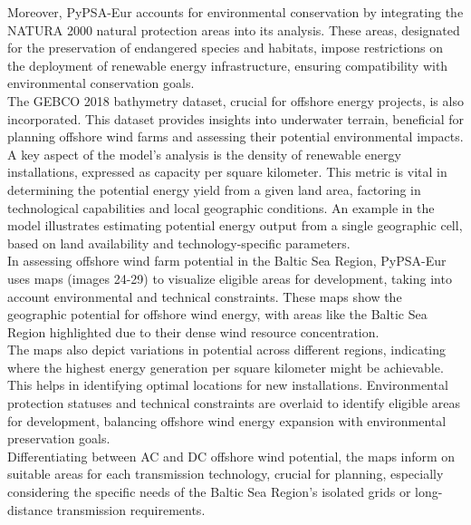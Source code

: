 Moreover, PyPSA-Eur accounts for environmental conservation by integrating the NATURA 2000 natural protection areas into its analysis. These areas, designated for the preservation of endangered species and habitats, impose restrictions on the deployment of renewable energy infrastructure, ensuring compatibility with environmental conservation goals.\\

The GEBCO 2018 bathymetry dataset, crucial for offshore energy projects, is also incorporated. This dataset provides insights into underwater terrain, beneficial for planning offshore wind farms and assessing their potential environmental impacts.\\

A key aspect of the model's analysis is the density of renewable energy installations, expressed as capacity per square kilometer. This metric is vital in determining the potential energy yield from a given land area, factoring in technological capabilities and local geographic conditions. An example in the model illustrates estimating potential energy output from a single geographic cell, based on land availability and technology-specific parameters.\\

In assessing offshore wind farm potential in the Baltic Sea Region, PyPSA-Eur uses maps (images 24-29) to visualize eligible areas for development, taking into account environmental and technical constraints. These maps show the geographic potential for offshore wind energy, with areas like the Baltic Sea Region highlighted due to their dense wind resource concentration.\\

The maps also depict variations in potential across different regions, indicating where the highest energy generation per square kilometer might be achievable. This helps in identifying optimal locations for new installations. Environmental protection statuses and technical constraints are overlaid to identify eligible areas for development, balancing offshore wind energy expansion with environmental preservation goals.\\

Differentiating between AC and DC offshore wind potential, the maps inform on suitable areas for each transmission technology, crucial for planning, especially considering the specific needs of the Baltic Sea Region's isolated grids or long-distance transmission requirements.\\

